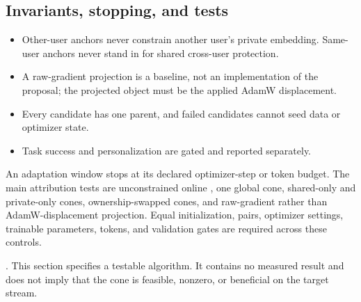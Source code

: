 \subsection{Invariants, stopping, and tests}

\begin{itemize}
  \item Other-user anchors never constrain another user's private embedding.
  Same-user anchors never stand in for shared cross-user protection.
  \item A raw-gradient projection is a baseline, not an implementation of the
  proposal; the projected object must be the applied AdamW displacement.
  \item Every candidate has one parent, and failed candidates cannot seed data
  or optimizer state.
  \item Task success and personalization are gated and reported separately.
\end{itemize}

An adaptation window stops at its declared optimizer-step or token budget.
The main attribution tests are unconstrained online \pdpo, one global cone,
shared-only and private-only cones, ownership-swapped cones, and raw-gradient
rather than AdamW-displacement projection.  Equal initialization, pairs,
optimizer settings, trainable parameters, tokens, and validation gates are
required across these controls.

\Evidence.  This section specifies a testable algorithm.  It contains no
measured result and does not imply that the cone is feasible, nonzero, or
beneficial on the target stream.
